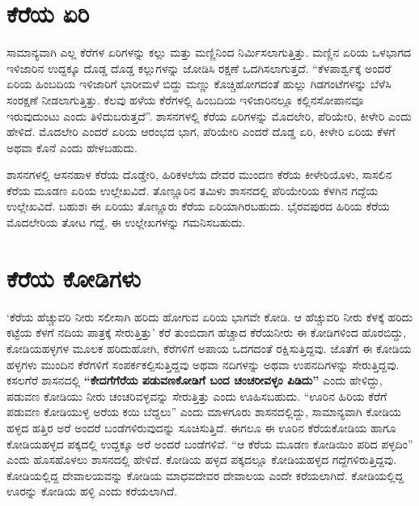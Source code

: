 \section{ಕೆರೆಯ ಏರಿ}

ಸಾಮಾನ್ಯವಾಗಿ ಎಲ್ಲ ಕೆರೆಗಳ ಏರಿಗಳನ್ನು ಕಲ್ಲು ಮತ್ತು ಮಣ್ಣಿನಿಂದ ನಿರ್ಮಿಸಲಾಗುತ್ತಿತ್ತು. ಮಣ್ಣಿನ ಏರಿಯ ಒಳಭಾಗದ ಇಳಿಜಾರಿನ ಉದ್ದಕ್ಕೂ ದೊಡ್ಡ ದೊಡ್ಡ ಕಲ್ಲುಗಳನ್ನು ಜೋಡಿಸಿ ರಕ್ಷಣೆ ಒದಗಿಸಲಾಗುತ್ತದೆ. “ಕೆಳಪಾರ್ಶ್ವಕ್ಕೆ ಅಂದರೆ ಏರಿಯ ಹಿಂಬದಿಯ ಇಳಿಜಾರಿಗೆ ಭಾರೀಮಳೆ ಬಿದ್ದು ಮಣ್ಣು ಕೊಚ್ಚಿಹೋಗದಂತೆ ಹುಲ್ಲು ಗಿಡಗಂಟೆಗಳನ್ನು ಬೆಳೆಸಿ ಸಂರಕ್ಷಣೆ ನೀಡಲಾಗುತ್ತಿತ್ತು. ಕೆಲವು ಹಳೆಯ ಕೆರೆಗಳಲ್ಲಿ ಹಿಂಬದಿಯ ಇಳಿಜಾರಿನಲ್ಲೂ ಕಲ್ಲಿನಸೋಪಾನವೂ ಇರುವುದುಂಟು ಎಂದು ತಿಳಿದುಬರುತ್ತದೆ”. ಶಾಸನಗಳಲ್ಲಿ ಕೆರೆಯ ಏರಿಗಳನ್ನು ಮೊದಲೇರಿ, ಪೆರಿಯೇರಿ, ಕೀಳೇರಿ ಎಂದು ಹೇಳಿದೆ. ಮೊದಲೇರಿ ಎಂದರೆ ಏರಿಯ ಆರಂಭದ ಭಾಗ, ಪೆರಿಯೇರಿ ಎಂದರೆ ದೊಡ್ಡ ಏರಿ, ಕೀಳೇರಿ ಏರಿಯ ಕೆಳಗೆ ಅಥವಾ ಕೊನೆ ಎಂದು ಹೇಳಬಹುದು.

ಶಾಸನಗಳಲ್ಲಿ ಆಸನಹಾಳ ಕೆರೆಯ ದೊಡ್ಡೇರಿ, ಹಿರಿಕಳಲೆಯ ದೇವರ ಮುಂದಣ ಕೆರೆಯ ಕೀಳೇರಿಯೊಳು, ಸಾಸಲಿನ ಕೆರೆಯ ಮೂಡಣ ಏರಿಯ ಉಲ್ಲೇಖವಿದೆ. ತೊಣ್ಣೂರಿನ ತಮಿಳು ಶಾಸನದಲ್ಲಿ ಪೆರಿಯೇರಿಯ ಕೆಳಗಿನ ಗದ್ದೆಯ ಉಲ್ಲೇಖವಿದೆ. ಬಹುಶಃ ಈ ಏರಿಯು ತೊಣ್ಣೂರು ಕೆರೆಯ ಏರಿಯಾಗಿರಬಹುದು. ಭೈರವಪುರದ ಹಿರಿಯ ಕೆರೆಯ ಮೊದಲೇರಿಯ ತೋಟ ಗದ್ದೆ, ಈ ಉಲ್ಲೇಖಗಳನ್ನು ಗಮನಿಸಬಹುದು.


\section{ಕೆರೆಯ ಕೋಡಿಗಳು}

‘ಕೆರೆಯ ಹೆಚ್ಚುವರಿ ನೀರು ಸಲೀಸಾಗಿ ಹರಿದು ಹೋಗುವ ಏರಿಯ ಭಾಗವೇ ಕೋಡಿ. ಆ ಹೆಚ್ಚುವರಿ ನೀರು ಕೆಳಕ್ಕೆ ಹರಿದು ಕಟ್ಟೆಯ ಕೆಳಗೆ ನದಿಯ ಪಾತ್ರಕ್ಕೆ ಸೇರುತ್ತಿತ್ತು’ ಕೆರೆ ತುಂಬಿದಾಗ ಹೆಚ್ಚಾದ ಕೆರೆಯನೀರು ಈ ಕೋಡಿಗಳಿಂದ ಹೊರಬಿದ್ದು, ಕೋಡಿಯಹಳ್ಳಗಳ ಮೂಲಕ ಹರಿದುಹೋಗಿ, ಕೆರೆಗಳಿಗೆ ಅಪಾಯ ಒದಗದಂತೆ ರಕ್ಷಿಸುತ್ತಿದ್ದವು. ಜೊತೆಗೆ ಈ ಕೋಡಿಯ ಹಳ್ಳಗಳು ಮುಂದಿನ ಕೆರೆಗಳಿಗೆ ಸಂಪರ್ಕಕಲ್ಪಿಸುತ್ತಿದ್ದವು ಅಥವಾ ನದಿಗಳನ್ನು ಅಥವಾ ಉಪನದಿಗಳನ್ನು ಸೇರುತ್ತಿದ್ದವು. ಕಸಲಗೆರೆ ಶಾಸನದಲ್ಲಿ \textbf{“ಕೇದಗೆಗೆರೆಯ ಪಡುವಣಕೋಡಿಗೆ ಬಂದ ಚಂಚರೀವಳ್ಳಂ ಪಿಡಿದು”} ಎಂದು ಹೇಳಿದ್ದು, ಪಡುವಣ ಕೋಡಿಯು ನೀರು ಚಂಚರಿವಳ್ಳವನ್ನು ಸೇರುತ್ತಿತ್ತು ಎಂದು ಊಹಿಸಬಹುದು. “ಊರಿನ ಹಿರಿಯ ಕೆರೆಗೆ ಪಡುವಣ ಕೋಡಿಯುಳ್ಳ ಅರೆಯ ಕಯಿ ಬೆದ್ದಲು” ಎಂದು ಮಾಳಗೂರು ಶಾಸನದಲ್ಲಿದ್ದು, ಸಾಮಾನ್ಯವಾಗಿ ಕೋಡಿಯ ಹಳ್ಳದ ಹತ್ತಿರ ಅರೆ ಅಂದರೆ ಬಂಡೆಗಳಿರುವುದನ್ನು ಸೂಚಿಸುತ್ತಿದೆ. ಈಗಲೂ ಈ ಊರಿನ ಕೆರೆಯಕೋಡಿಯ ಹಾಗೂ ಕೋಡಿಯಹಳ್ಳದ ಪಕ್ಕದಲ್ಲಿ ಉದ್ದಕ್ಕೂ ಅರೆ ಅಂದರೆ ಬಂಡೆಗಳಿವೆ. “ಆ ಕೆರೆಯ ಮೂಡಣ ಕೋಡಿಯಿಂ ಪರಿದ ಪಳ್ಳದಿಂ” ಎಂದು ಹೊಸಹೊಳಲು ಶಾಸನದಲ್ಲಿ ಹೇಳಿದೆ. ಕೋಡಿಯ ಹಳ್ಳದ ಪಕ್ಕದಲ್ಲೂ ಕೋಡಿಯಹಳ್ಳದ ಗದ್ದೆಗಳಿರುತ್ತಿದ್ದವು. ಕೋಡಿಯಲ್ಲಿದ್ದ ದೇವಾಲಯವನ್ನು ಕೋಡಿಯ ಮಾಧವದೇವರ ದೇವಾಲಯ ಎಂದೇ ಕರೆಯಲಾಗಿದೆ. ಕೋಡಿಯಲ್ಲಿದ್ದ ಊರನ್ನು ಕೋಡಿಯ ಹಳ್ಳಿ ಎಂದು ಕರೆಯಲಾಗಿದೆ.

